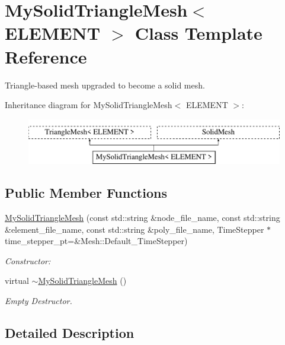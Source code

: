 \hypertarget{classMySolidTriangleMesh}{}\section{My\+Solid\+Triangle\+Mesh$<$ E\+L\+E\+M\+E\+NT $>$ Class Template Reference}
\label{classMySolidTriangleMesh}


Triangle-\/based mesh upgraded to become a solid mesh.  


Inheritance diagram for My\+Solid\+Triangle\+Mesh$<$ E\+L\+E\+M\+E\+NT $>$\+:\begin{figure}[H]
\begin{center}
\leavevmode
\includegraphics[height=2.000000cm]{classMySolidTriangleMesh}
\end{center}
\end{figure}
\subsection*{Public Member Functions}
\begin{DoxyCompactItemize}
\item 
\hyperlink{classMySolidTriangleMesh_a13939dc0593c5707c0099e3586161ce6}{My\+Solid\+Triangle\+Mesh} (const std\+::string \&node\+\_\+file\+\_\+name, const std\+::string \&element\+\_\+file\+\_\+name, const std\+::string \&poly\+\_\+file\+\_\+name, Time\+Stepper $\ast$time\+\_\+stepper\+\_\+pt=\&Mesh\+::\+Default\+\_\+\+Time\+Stepper)
\begin{DoxyCompactList}\small\item\em Constructor\+: \end{DoxyCompactList}\item 
virtual \hyperlink{classMySolidTriangleMesh_a46ef4b04ede9bdeb053c25dbb742806a}{$\sim$\+My\+Solid\+Triangle\+Mesh} ()
\begin{DoxyCompactList}\small\item\em Empty Destructor. \end{DoxyCompactList}\end{DoxyCompactItemize}


\subsection{Detailed Description}
